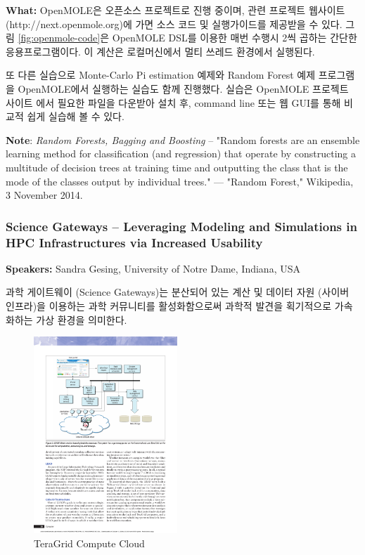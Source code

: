 \documentclass[twocolumn]{article}
\begin{document}
\noindent
\textbf{What:} OpenMOLE은 오픈소스 프로젝트로 진행 중이며, 관련 프로젝트 웹사이트 (http://next.openmole.org)에 가면 소스 코드 및 실행가이드를 제공받을 수 있다. 그림 \ref{fig:openmole-code}은 OpenMOLE DSL를 이용한 매번 수행시 2씩 곱하는 간단한 응용프로그램이다. 이 계산은 로컬머신에서 멀티 쓰레드 환경에서 실행된다.

또 다른 실습으로 Monte-Carlo Pi estimation 예제와 Random Forest 예제 프로그램을 OpenMOLE에서 실행하는 실습도 함께 진행했다. 실습은 OpenMOLE 프로젝트 사이트 \cite{openmole:2015}에서 필요한 파일을 다운받아 설치 후, command line 또는 웹 GUI를 통해 비교적 쉽게 실습해 볼 수 있다.

\noindent
\textbf{Note}: \textit{Random Forests, Bagging and Boosting} --
"Random forests are an ensemble learning method for classification (and regression) that operate by constructing a multitude of decision trees at training time and outputting the class that is the mode of the classes output by individual trees." — "Random Forest," Wikipedia, 3 November 2014.

\subsubsection{Science Gateways – Leveraging Modeling and Simulations in HPC Infrastructures via Increased Usability}
\textbf{Speakers:} Sandra Gesing, University of Notre Dame, Indiana, USA

과학 게이트웨이 (Science Gateways)는 분산되어 있는 계산 및 데이터 자원 (사이버 인프라)을 이용하는 과학 커뮤니티를 활성화함으로써 과학적 발견을 획기적으로 가속화하는 가상 환경을 의미한다.

\begin{figure}[htb]
        \centering
        \includegraphics[width=0.48\textwidth]{teragrid-compute-cloud.pdf}
        \caption{TeraGrid Compute Cloud}
        \label{fig:teragrid-compute-cloud}
\end{figure}
\end{document}
